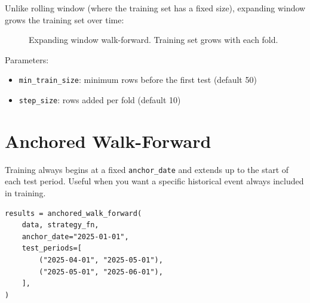\documentclass[12pt,a4paper]{report}
\theoremstyle{definition}
\newcommand{\code}[1]{\texttt{#1}}
\begin{document}
Unlike rolling window (where the training set has a fixed size), expanding window grows the training set over time:

\begin{figure}[H]
\centering
{}
\caption{Expanding window walk-forward. Training set grows with each fold.}
\label{fig:expanding-wf}
\end{figure}

Parameters:
\begin{itemize}
    \item \code{min\_train\_size}: minimum rows before the first test (default 50)
    \item \code{step\_size}: rows added per fold (default 10)
\end{itemize}

\section{Anchored Walk-Forward}
\label{sec:anchored-wf}

Training always begins at a fixed \code{anchor\_date} and extends up to the start of each test period. Useful when you want a specific historical event always included in training.

\begin{lstlisting}[caption={Anchored walk-forward usage.}]
results = anchored_walk_forward(
    data, strategy_fn,
    anchor_date="2025-01-01",
    test_periods=[
        ("2025-04-01", "2025-05-01"),
        ("2025-05-01", "2025-06-01"),
    ],
)
\end{lstlisting}
\end{document}
